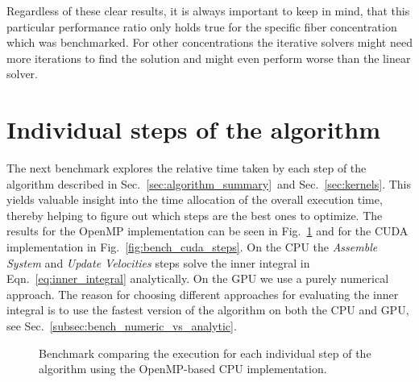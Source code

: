 Regardless of these clear results, it is always important to keep in mind, that this particular performance ratio only holds true for the specific fiber concentration which was benchmarked. For other concentrations the iterative solvers might need more iterations to find the solution and might even perform worse than the linear solver.

\section{Individual steps of the algorithm}

The next benchmark explores the relative time taken by each step of the algorithm described in Sec.~\ref{sec:algorithm_summary}~and Sec.~\ref{sec:kernels}. This yields valuable insight into the time allocation of the overall execution time, thereby helping to figure out which steps are the best ones to optimize. The results for the OpenMP implementation can be seen in Fig.~\ref{fig:bench_openmp_steps} and for the CUDA implementation in Fig.~\ref{fig:bench_cuda_steps}. On the CPU the \emph{Assemble System} and \emph{Update Velocities} steps solve the inner integral in Eqn.~\eqref{eq:inner_integral} analytically. On the GPU we use a purely numerical approach. The reason for choosing different approaches for evaluating the inner integral is to use the fastest version of the algorithm on both the CPU and GPU, see Sec.~\ref{subsec:bench_numeric_vs_analytic}.

\begin{figure}[!htbp]
  \centering
  \caption[Benchmark individual steps on CPU.]{Benchmark comparing the execution for each individual step of the algorithm using the OpenMP-based CPU implementation.}
  \label{fig:bench_openmp_steps}
\end{figure}

